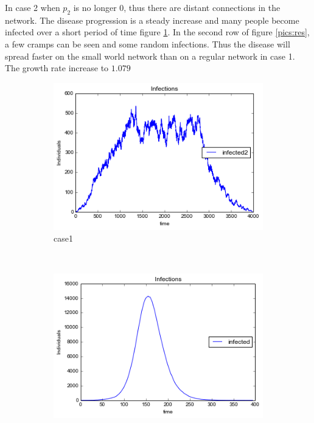 In case 2 when $p_2$ is no longer 0, thus  there are distant connections in the network. The disease progression is a steady increase and many people become infected over a short period of time figure \ref{a}. In the second row of figure \ref{pics:res}, a few cramps can be seen and some random infections.  Thus the disease will spread faster on the small world network than on a regular network in case 1. The growth rate increase to $1.079$


\begin{figure}[!htb]
    \centering
    \begin{subfigure}[b]{0.3\textwidth}
        \includegraphics[width=\textwidth]{images/1infections}
        \caption{ case1 }
        \label{a}
    \end{subfigure}
    ~ %
    \begin{subfigure}[b]{0.3\textwidth}
        \includegraphics[width=\textwidth]{images/3infections}

\end{subfigure}
\end{figure}
